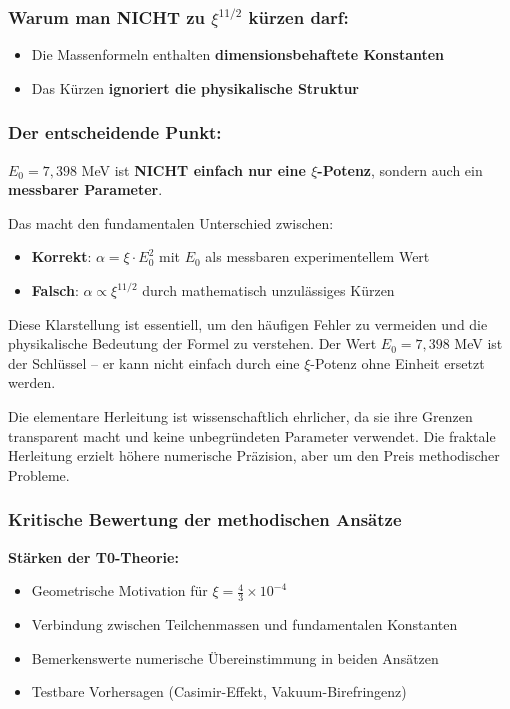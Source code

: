 \documentclass[12pt,a4paper]{article}
\theoremstyle{definition}
\begin{document}
\subsubsection{Warum man NICHT zu $\xi^{11/2}$ kürzen darf:}

\begin{itemize}

	\item Die Massenformeln enthalten \textbf{dimensionsbehaftete Konstanten}
	\item Das Kürzen \textbf{ignoriert die physikalische Struktur}
\end{itemize}

\subsubsection{Der entscheidende Punkt:}

$E_0 = 7{,}398$ MeV ist \textbf{NICHT einfach nur eine $\xi$-Potenz}, sondern auch ein \textbf{messbarer Parameter}.

Das macht den fundamentalen Unterschied zwischen:
\begin{itemize}
	\item \textbf{Korrekt}: $\alpha = \xi \cdot E_0^2$ mit $E_0$ als messbaren experimentellem Wert
	\item \textbf{Falsch}: $\alpha \propto \xi^{11/2}$ durch mathematisch unzulässiges Kürzen
\end{itemize}

Diese Klarstellung ist essentiell, um den häufigen Fehler zu vermeiden und die physikalische Bedeutung der Formel zu verstehen. Der Wert $E_0 = 7{,}398$ MeV ist der Schlüssel -- er kann nicht einfach durch eine $\xi$-Potenz ohne Einheit ersetzt werden.
	
	Die elementare Herleitung ist wissenschaftlich ehrlicher, da sie ihre Grenzen transparent macht und keine unbegründeten Parameter verwendet. Die fraktale Herleitung erzielt höhere numerische Präzision, aber um den Preis methodischer Probleme.
	
	\subsubsection{Kritische Bewertung der methodischen Ansätze}
	
	\textbf{Stärken der T0-Theorie:}
	\begin{itemize}
		\item Geometrische Motivation für $\xi = \frac{4}{3} \times 10^{-4}$
		\item Verbindung zwischen Teilchenmassen und fundamentalen Konstanten
		\item Bemerkenswerte numerische Übereinstimmung in beiden Ansätzen
		\item Testbare Vorhersagen (Casimir-Effekt, Vakuum-Birefringenz)
	\end{itemize}
	
\end{document}
